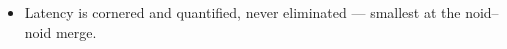\begin{itemize}
    \item Latency is cornered and quantified, never eliminated — smallest at the noid--noid merge. 

\end{itemize}
